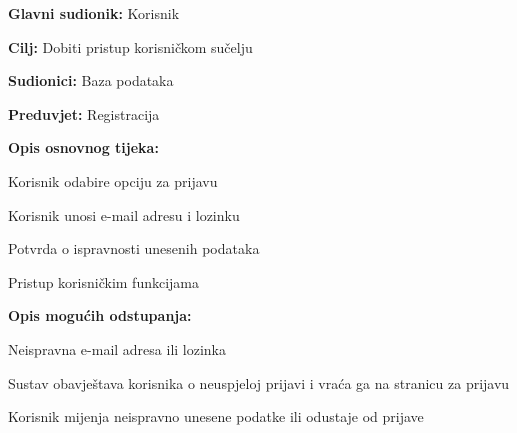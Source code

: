 					\noindent {}
					\begin{packed_item}
						
						\item \textbf{Glavni sudionik: }Korisnik
						\item  \textbf{Cilj:} Dobiti pristup korisničkom sučelju 
						\item  \textbf{Sudionici:} Baza podataka
						\item  \textbf{Preduvjet:} Registracija
						\item  \textbf{Opis osnovnog tijeka:}
						
						\item[] \begin{packed_enum}
							
							\item Korisnik odabire opciju za prijavu
							\item Korisnik unosi e-mail adresu i lozinku
							\item Potvrda o ispravnosti unesenih podataka
							\item Pristup korisničkim funkcijama
						\end{packed_enum}
						
						\item  \textbf{Opis mogućih odstupanja:}
						
						\item[] \begin{packed_item}
							
							\item[2.a] Neispravna e-mail adresa ili lozinka
							\item[] \begin{packed_enum}
								
								\item Sustav obavještava korisnika o neuspjeloj prijavi i vraća ga na stranicu za prijavu
								\item Korisnik mijenja neispravno unesene podatke ili odustaje od prijave
								
							\end{packed_enum}
							
						\end{packed_item}
					\end{packed_item}
					
